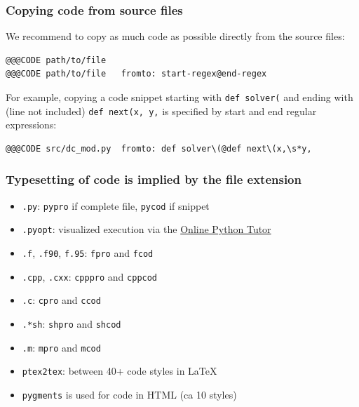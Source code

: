 \documentclass{beamer}
\begin{document}
\begin{frame}
\frametitle{Copying code from source files}

We recommend to copy as much code as possible directly from the
source files:

\begin{Verbatim}[numbers=none,fontsize=\fontsize{9pt}{9pt},baselinestretch=0.95]
@@@CODE path/to/file
@@@CODE path/to/file   fromto: start-regex@end-regex
\end{Verbatim}
For example, copying a code snippet starting with \Verb!def solver(! and
ending with (line not included) \Verb!def next(x, y,! is specified by
start and end regular expressions:

\begin{Verbatim}[numbers=none,fontsize=\fontsize{9pt}{9pt},baselinestretch=0.95]
@@@CODE src/dc_mod.py  fromto: def solver\(@def next\(x,\s*y,
\end{Verbatim}
\end{frame}

\begin{frame}
\frametitle{Typesetting of code is implied by the file extension}

\begin{itemize}
 \item \Verb!.py!: \Verb!pypro! if complete file, \Verb!pycod! if snippet

 \item \Verb!.pyopt!: visualized execution via the \href{{http://pythontutor.com}}{Online Python Tutor}

 \item \Verb!.f!, \Verb!.f90!, \Verb!f.95!: \Verb!fpro! and \Verb!fcod!

 \item \Verb!.cpp!, \Verb!.cxx!: \Verb!cpppro! and \Verb!cppcod!

 \item \Verb!.c!: \Verb!cpro! and \Verb!ccod!

 \item \Verb!.*sh!: \Verb!shpro! and \Verb!shcod!

 \item \Verb!.m!: \Verb!mpro! and \Verb!mcod!

 \item \Verb!ptex2tex!: between 40+ code styles in {\LaTeX}

 \item \Verb!pygments! is used for code in HTML (ca 10 styles)
\end{itemize}

\noindent
\end{frame}
\end{document}
